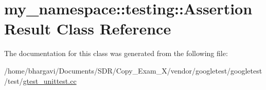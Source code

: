 \hypertarget{classmy__namespace_1_1testing_1_1_assertion_result}{}\section{my\+\_\+namespace\+:\+:testing\+:\+:Assertion\+Result Class Reference}
\label{classmy__namespace_1_1testing_1_1_assertion_result}


The documentation for this class was generated from the following file\+:\begin{DoxyCompactItemize}
\item 
/home/bhargavi/\+Documents/\+S\+D\+R/\+Copy\+\_\+\+Exam\+\_\+X/vendor/googletest/googletest/test/\hyperlink{gtest__unittest_8cc}{gtest\+\_\+unittest.\+cc}\end{DoxyCompactItemize}
